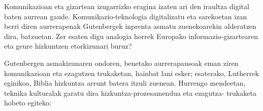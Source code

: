 \begin{multicols}{2}
    Komunikazioan eta gizartean izugarrizko eragina izaten ari den iraultza digital baten aurrean gaude. Komunikazio-teknologia digitalizatu eta sarekoetan izan berri diren aurrerapenak Gutenbergek inprenta asmatu zuenekoarekin alderatzen dira, batzuetan. Zer esaten digu analogia horrek Europako informazio-gizartearen eta geure hizkuntzen etorkizunari buruz?

Gutenbergen asmakizunaren ondoren, benetako aurrerapausoak eman ziren komunikazioan eta ezagutzen trukaketan, hainbat lani esker; esaterako, Lutherrek eginikoa, Biblia hizkuntza arrunt batera itzuli zuenean. Hurrengo mendeetan, teknika kulturalak garatu dira hizkuntza-prozesamendua eta ezagutza- trukaketa hobeto egiteko:
 

\end{multicols}

